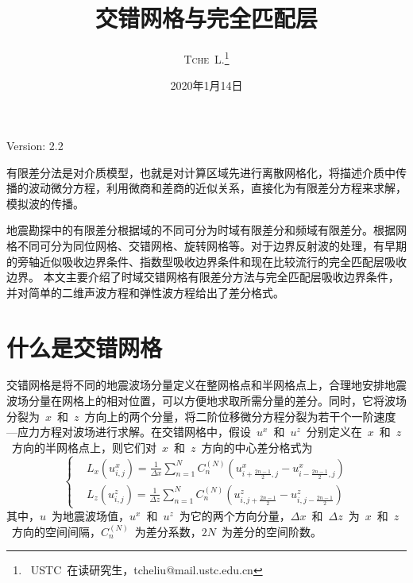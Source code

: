 \documentclass[UTF8]{ctexart}
\title{\vspace{10mm}\heiti\huge 交错网格与完全匹配层\vspace{30mm}}
\author{\LARGE\textsc{Tche~L.}\thanks{~USTC~在读研究生，tcheliu@mail.ustc.edu.cn}\vspace{10mm}}
\date{2020年1月14日}
\renewcommand{\cite}[1]{\textsuperscript{\textsuperscript{\citeleft\citen{#1}\citeright}}}          %
\begin{document}
\maketitle
\centerline{Version: 2.2}
\vspace{50mm}

有限差分法是对介质模型，也就是对计算区域先进行离散网格化，将描述介质中传播的波动微分方程，利用微商和差商的近似关系，直接化为有限差分方程来求解，模拟波的传播。\par
地震勘探中的有限差分根据域的不同可分为时域有限差分和频域有限差分。根据网格不同可分为同位网格\cite{Alterman_1968}、交错网格\cite{Virieux_1984}\cite{Virieux_1986}、旋转网格\cite{Saenger_2000}\cite{Saenger_2004}等。对于边界反射波的处理，有早期的旁轴近似吸收边界条件\cite{Clayton_1977}、指数型吸收边界条件\cite{Cerjan_1985}和现在比较流行的完全匹配层吸收边界\cite{Collino_2001}。
本文主要介绍了时域交错网格有限差分方法与完全匹配层吸收边界条件，并对简单的二维声波方程和弹性波方程给出了差分格式。\par

\newpage

\section{什么是交错网格}
交错网格是将不同的地震波场分量定义在整网格点和半网格点上，合理地安排地震波场分量在网格上的相对位置，可以方便地求取所需分量的差分。同时，它将波场分裂为~$x$~和~$z$~方向上的两个分量，将二阶位移微分方程分裂为若干个一阶速度—应力方程对波场进行求解。在交错网格中，假设~$u^x$~和~$u^z$~分别定义在~$x$~和~$z$~方向的半网格点上，则它们对~$x$~和~$z$~方向的中心差分格式为\cite{sun_2013}
\begin{equation}
\left\{ \begin{aligned}
& L_x(u^x_{i,j})=\frac{1}{\Delta x}\sum_{n=1}^{N}C_n^{(N)}(u^x_{i+\frac{2n-1}{2},j}-u^x_{i-\frac{2n-1}{2},j}) \\
& L_z(u^z_{i,j})=\frac{1}{\Delta z}\sum_{n=1}^{N}C_n^{(N)}(u^z_{i,j+\frac{2n-1}{2}}-u^z_{i,j-\frac{2n-1}{2}})
\end{aligned} \right.
\end{equation}
其中，$u$~为地震波场值，$u^x$~和~$u^z$~为它的两个方向分量，$\Delta x$~和~$\Delta z$~为~$x$~和~$z$~方向的空间间隔，$C_n^{(N)}$~为差分系数，$2N$~为差分的空间阶数。\par
\end{document}
